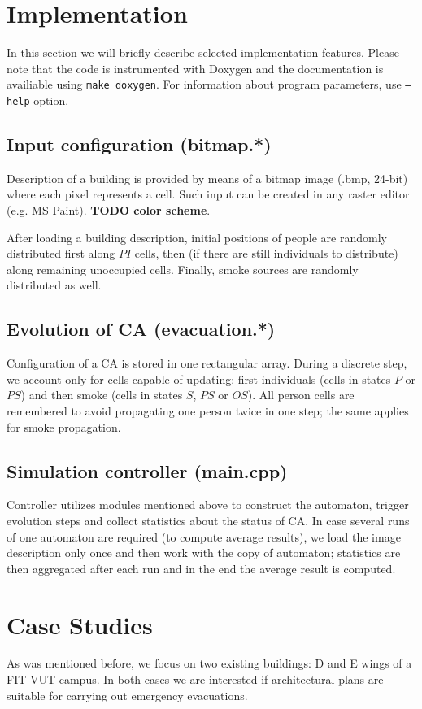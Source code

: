 \section{Implementation}
In this section we will briefly describe selected implementation features.
Please note that the code is instrumented with Doxygen and the documentation is
availiable using \texttt{make doxygen}.
For information about program parameters, use \texttt{--help} option.

\subsection{Input configuration (bitmap.*)}
Description of a building is provided by means of a bitmap image (.bmp, 24-bit)
where each pixel represents a cell.
Such input can be created in any raster editor (e.g. MS Paint).
\textbf{TODO color scheme}.

After loading a building description, initial positions of people are randomly
distributed first along $PI$ cells, then (if there are still individuals to
distribute) along remaining unoccupied cells.
Finally, smoke sources are randomly distributed as well.

\subsection{Evolution of CA (evacuation.*)}
Configuration of a CA is stored in one rectangular array.
During a discrete step, we account only for cells capable of updating: first
individuals (cells in states $P$ or $PS$) and then smoke (cells in states $S$,
$PS$ or $OS$).
All person cells are remembered to avoid propagating one person twice in one
step; the same applies for smoke propagation.

\subsection{Simulation controller (main.cpp)}
Controller utilizes modules mentioned above to construct the automaton,
trigger evolution steps and collect statistics about the status of CA.
In case several runs of one automaton are required (to compute average
results), we load the image description only once and then work with
the copy of automaton; statistics are then aggregated after each run and
in the end the average result is computed.

\section{Case Studies}
As was mentioned before, we focus on two existing buildings: D and E wings of a 
FIT VUT campus.
In both cases we are interested if architectural plans are suitable for carrying
out emergency evacuations.

